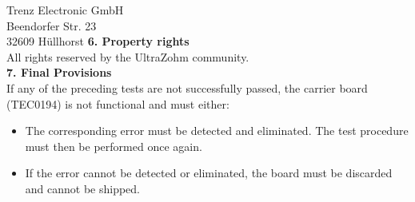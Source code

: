 \documentclass[
	fontsize=12pt,
	parskip=full,
	paper=A4,	
	fromalign=right,
	fromphone=false,
	fromemail=true,
	version=last,
	fromlogo=true,
]{scrlttr2}
\begin{document}
\begin{letter}{
	Trenz Electronic GmbH\\
	Beendorfer Str. 23\\
	32609 Hüllhorst
}
\textbf{6. Property rights}\\

All rights reserved by the UltraZohm community.\\


\textbf{7. Final Provisions}\\

If any of the preceding tests are not successfully passed, the carrier board (TEC0194) is not functional and must either:
\begin{itemize}
    \item The corresponding error must be detected and eliminated. The test procedure must then be performed once again.
    \item If the error cannot be detected or eliminated, the board must be discarded and cannot be shipped.
\end{itemize} 
 

\closing{ }%


\end{letter}

%
\end{document}
